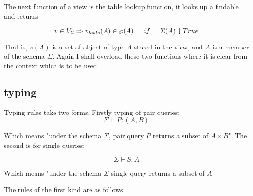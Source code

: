 \documentclass[twoside,a4paper,11pt]{article}
\begin{document}
The next function of a view is the table lookup function, it looks up a findable and returns

$$v \in V_\Sigma \Rightarrow v_{table}(A) \in \wp(A)\indent if\indent \Sigma(A)\downarrow True$$

That is, $v(A)$ is a set of object of type $A$ stored in the view, and $A$ is a member of the schema $\Sigma$. Again I shall overload these two functions where it is clear from the context which is to be used.

\subsection{typing}

Typing rules take two forms. Firstly typing of pair queries:
$$ \Sigma \vdash P\colon (A, B)$$

Which means "under the schema $\Sigma$, pair query $P$ returns a subset of $A \times B$".  The second is for single queries:

$$ \Sigma \vdash S \colon A $$

Which means "under the schema $\Sigma$ single query returns a subset of $A$

The rules of the first kind are as follows
\end{document}
